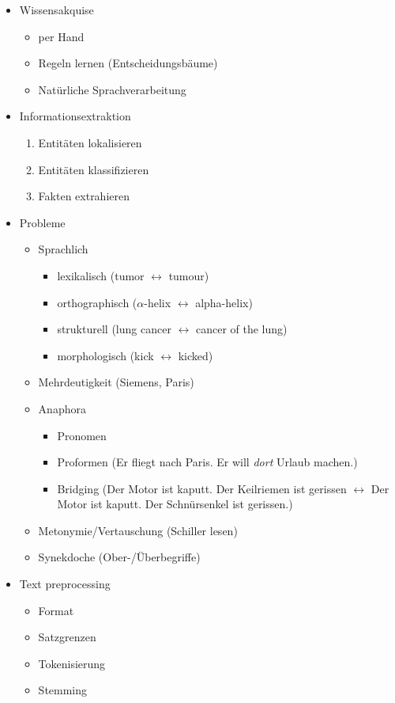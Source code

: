 \documentclass[nonacm=true, language=german]{acmart}
\begin{document}
\begin{itemize}
    \item Wissensakquise
    \begin{itemize}
        \item per Hand
        \item Regeln lernen (Entscheidungsbäume)
        \item Natürliche Sprachverarbeitung
    \end{itemize}
    
    \item Informationsextraktion
    \begin{enumerate}
        \item Entitäten lokalisieren
        \item Entitäten klassifizieren
        \item Fakten extrahieren
    \end{enumerate}
    
    \item Probleme
    \begin{itemize}
        \item Sprachlich
        \begin{itemize}
            \item lexikalisch (tumor $\leftrightarrow$ tumour)
            \item orthographisch ($\alpha$-helix $\leftrightarrow$ alpha-helix)
            \item strukturell (lung cancer $\leftrightarrow$ cancer of the lung)
            \item morphologisch (kick $\leftrightarrow$ kicked)
        \end{itemize}
        
        \item Mehrdeutigkeit (Siemens, Paris)
        \item Anaphora
        \begin{itemize}
            \item Pronomen
            \item Proformen (Er fliegt nach Paris. Er will \textit{dort} Urlaub machen.)
            \item Bridging (Der Motor ist kaputt. Der Keilriemen ist gerissen $\leftrightarrow$ Der Motor ist kaputt. Der Schnürsenkel ist gerissen.)
        \end{itemize}
        
        \item Metonymie/Vertauschung (Schiller lesen)
        \item Synekdoche (Ober-/Überbegriffe)
    \end{itemize}
    
    \item Text preprocessing
    \begin{itemize}
        \item Format
        \item Satzgrenzen
        \item Tokenisierung
        \item Stemming
    \end{itemize}
\end{itemize}
\end{document}
